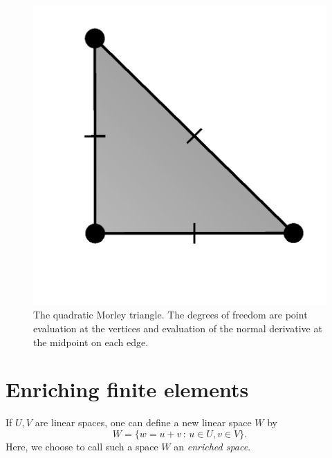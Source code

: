 \begin{figure}
  \begin{center}
    \includegraphics[width=\elmfigsizesingle]{chapters/kirby-6/png/MOR_2d.png}
    \caption{The quadratic Morley triangle. The degrees of freedom are
      point evaluation at the vertices and evaluation of the normal
      derivative at the midpoint on each edge.}
  \end{center}
\end{figure}

\section{Enriching finite elements}

If $U, V$ are linear spaces, one can define a new linear space $W$ by
\begin{equation}
  W = \{ w = u + v \, : \, u \in U, v \in V \}.
\end{equation}
Here, we choose to call such a space $W$ an \emph{enriched space}.

